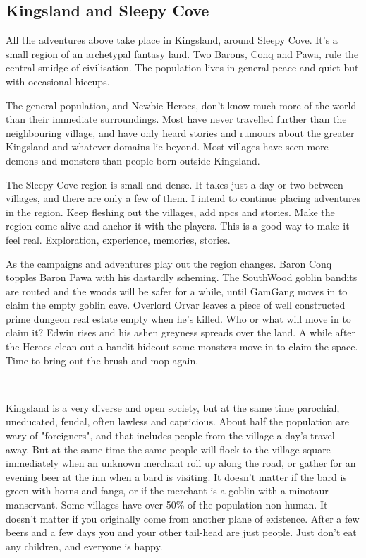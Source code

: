 \subsection*{Kingsland and Sleepy Cove}
All the adventures above take place in Kingsland, around Sleepy Cove. It's a small region of an archetypal fantasy land. Two Barons, Conq and Pawa, rule the central smidge of civilisation. The population lives in general peace and quiet but with occasional hiccups.

The general population, and Newbie Heroes, don't know much more of the world than their immediate surroundings. Most have never travelled further than the neighbouring village, and have only heard stories and rumours about the greater Kingsland and whatever domains lie beyond. Most villages have seen more demons and monsters than people born outside Kingsland.

The Sleepy Cove region is small and dense. It takes just a day or two between villages, and there are only a few of them.
I intend to continue placing adventures in the region. Keep fleshing out the villages, add npcs and stories. Make the region come alive and anchor it with the players. This is a good way to make it feel real. Exploration, experience, memories, stories.

As the campaigns and adventures play out the region changes. Baron Conq topples Baron Pawa with his dastardly scheming. The SouthWood goblin bandits are routed and the woods will be safer for a while, until GamGang moves in to claim the empty goblin cave. Overlord Orvar leaves a piece of well constructed prime dungeon real estate empty when he's killed. Who or what will move in to claim it? Edwin rises and his ashen greyness spreads over the land. A while after the Heroes clean out a bandit hideout some monsters move in to claim the space. Time to bring out the brush and mop again.

\

\label{sec:kingslandsociety}
Kingsland is a very diverse and open society, but at the same time parochial, uneducated, feudal, often lawless and capricious. About half the population are wary of "foreigners", and that includes people from the village a day's travel away. But at the same time the same people will flock to the village square immediately when an unknown merchant roll up along the road, or gather for an evening beer at the inn when a bard is visiting. It doesn't matter if the bard is green with horns and fangs, or if the merchant is a goblin with a minotaur manservant. Some villages have over 50\% of the population non human. It doesn't matter if you originally come from another plane of existence. After a few beers and a few days you and your other tail-head are just people. Just don't eat any children, and everyone is happy.

